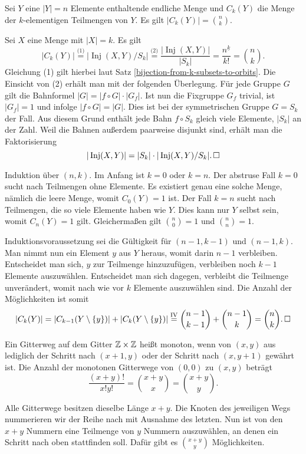 \begin{Satz}\newlinefirst
Sei $Y$ eine $|Y|=n$ Elemente enthaltende endliche Menge und $C_k(Y)$
die Menge der $k$-elementigen Teilmengen von $Y$.
Es gilt $|C_k(Y)| = \binom{n}{k}$.
\end{Satz}
\begin{Beweis}[Beweis 1]
Sei $X$ eine Menge mit $|X|=k$. Es gilt
\[|C_k(Y)|
\stackrel{\text{(1)}}= |\operatorname{Inj}(X,Y)/S_k|
\stackrel{\text{(2)}}= \frac{|\operatorname{Inj}(X,Y)|}{|S_k|}
= \frac{n^{\underline k}}{k!} = \binom{n}{k}.\]
Gleichung (1) gilt hierbei laut Satz
\ref{bijection-from-k-subsets-to-orbits}.
Die Einsicht von (2) erhält man mit der folgenden Überlegung.
Für jede Gruppe $G$ gilt die Bahnformel $|G| = |f\circ G|\cdot |G_f|$.
Ist nun die Fixgruppe $G_f$ trivial, ist $|G_f|=1$ und
infolge $|f\circ G|=|G|$. Dies ist bei der symmetrischen Gruppe
$G=S_k$ der Fall. Aus diesem Grund enthält jede Bahn $f\circ S_k$
gleich viele Elemente, $|S_k|$ an der Zahl. Weil die Bahnen außerdem
paarweise disjunkt sind, erhält man die Faktorisierung
\[|\operatorname{Inj}(X,Y)| = |S_k|\cdot |\operatorname{Inj}(X,Y)/S_k|.\,\square\]
\end{Beweis}
\begin{Beweis}[Beweis 2]
Induktion über $(n, k)$. Im Anfang ist $k=0$ oder $k=n$. Der abstruse
Fall $k=0$ sucht nach Teilmengen ohne Elemente. Es existiert genau eine
solche Menge, nämlich die leere Menge, womit $C_0(Y)=1$ ist. Der Fall
$k=n$ sucht nach Teilmengen, die so viele Elemente haben wie $Y$.
Dies kann nur $Y$ selbst sein, womit $C_n(Y)=1$ gilt.
Gleichermaßen gilt $\binom{n}{0}=1$ und $\binom{n}{n}=1$.

Induktionsvoraussetzung sei die Gültigkeit für $(n-1, k-1)$ und
$(n-1, k)$. Man nimmt nun ein Element $y$ aus $Y$ heraus,
womit darin $n-1$ verbleiben. Entscheidet man sich,
$y$ zur Teilmenge hinzuzufügen, verbleiben noch $k-1$ Elemente
auszuwählen. Entscheidet man sich dagegen, verbleibt die Teilmenge
unverändert, womit nach wie vor $k$ Elemente auszuwählen sind.
Die Anzahl der Möglichkeiten ist somit
\[|C_k(Y)| = |C_{k-1}(Y\setminus\{y\})| + |C_k(Y\setminus\{y\})|
\stackrel{\mathrm{IV}}=\binom{n-1}{k-1} + \binom{n-1}{k}
= \binom{n}{k}.\,\square\]
\end{Beweis}

\begin{Satz}\newlinefirst
Ein Gitterweg auf dem Gitter $\mathbb Z\times\mathbb Z$ heißt
monoton, wenn von $(x,y)$ aus lediglich der Schritt nach $(x+1,y)$
oder der Schritt nach $(x,y+1)$ gewährt ist. Die Anzahl der monotonen
Gitterwege von $(0,0)$ zu $(x,y)$ beträgt
\[\frac{(x+y)!}{x!y!} = \binom{x+y}{x} = \binom{x+y}{y}.\]
\end{Satz}
\begin{Beweis}[Beweis 1]
Alle Gitterwege besitzen dieselbe Länge $x+y$. Die Knoten des jeweiligen
Wegs nummerieren wir der Reihe nach mit Ausnahme des letzten. Nun
ist von den $x+y$ Nummern eine Teilmenge von $y$ Nummern auszuwählen,
an denen ein Schritt nach oben stattfinden soll. Dafür gibt es
$\binom{x+y}{y}$ Möglichkeiten.\,\qedsymbol
\end{Beweis}

